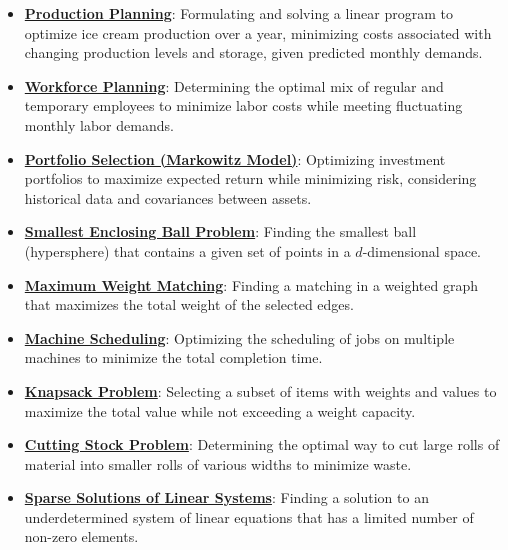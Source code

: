 \documentclass{article}%
\begin{document}
\begin{itemize}[leftmargin=*]%
\item \href{https://www.math.purdue.edu/~yipn/421/2024-10-28-ApplsLinProg.pdf#page=3}{\textbf{Production Planning}}: Formulating and solving a linear program to optimize ice cream production over a year, minimizing costs associated with changing production levels and storage, given predicted monthly demands.%
\item \href{https://www.math.purdue.edu/~yipn/421/2024-10-28-ApplsLinProg.pdf#page=7}{\textbf{Workforce Planning}}: Determining the optimal mix of regular and temporary employees to minimize labor costs while meeting fluctuating monthly labor demands.%
\item \href{https://www.math.purdue.edu/~yipn/421/2024-10-28-ApplsLinProg.pdf#page=9}{\textbf{Portfolio Selection (Markowitz Model)}}: Optimizing investment portfolios to maximize expected return while minimizing risk, considering historical data and covariances between assets.%
\item \href{https://www.math.purdue.edu/~yipn/421/2024-10-28-ApplsLinProg.pdf#page=17}{\textbf{Smallest Enclosing Ball Problem}}: Finding the smallest ball (hypersphere) that contains a given set of points in a $d$-dimensional space.%
\item \href{https://www.math.purdue.edu/~yipn/421/2024-10-28-ApplsLinProg.pdf#page=19}{\textbf{Maximum Weight Matching}}: Finding a matching in a weighted graph that maximizes the total weight of the selected edges.%
\item \href{https://www.math.purdue.edu/~yipn/421/2024-10-28-ApplsLinProg.pdf#page=22}{\textbf{Machine Scheduling}}: Optimizing the scheduling of jobs on multiple machines to minimize the total completion time.%
\item \href{https://www.math.purdue.edu/~yipn/421/2024-10-28-ApplsLinProg.pdf#page=24}{\textbf{Knapsack Problem}}: Selecting a subset of items with weights and values to maximize the total value while not exceeding a weight capacity.%
\item \href{https://www.math.purdue.edu/~yipn/421/2024-10-28-ApplsLinProg.pdf#page=25}{\textbf{Cutting Stock Problem}}: Determining the optimal way to cut large rolls of material into smaller rolls of various widths to minimize waste.%
\item \href{https://www.math.purdue.edu/~yipn/421/2024-10-28-ApplsLinProg.pdf#page=30}{\textbf{Sparse Solutions of Linear Systems}}: Finding a solution to an underdetermined system of linear equations that has a limited number of non-zero elements.%
\end{itemize}%
\end{document}
